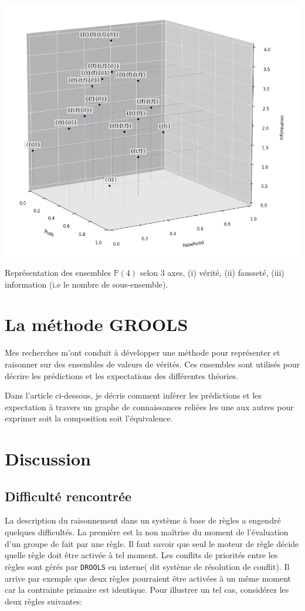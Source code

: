 \begin{refsegment}
\begin{shadedfigure}[H]
    \centering
    \includegraphics[width=\textwidth]{img/set_3d.png}
    \caption{Représentation des ensembles  $\mathbb{P}(4)$ selon 3 axes, (i) vérité, (ii) fausseté, (iii) information (i.e le nombre de sous-ensemble).}
    \label{fig:set3d}
\end{shadedfigure}

\section{La méthode GROOLS}\label{sec:methode}

Mes recherches m'ont conduit à développer une méthode pour représenter et raisonner sur des ensembles de valeurs de vérités. Ces ensembles sont utilisés pour décrire les prédictions et les expectations des différentes théories.

Dans l'article ci-dessous, je décris comment inférer les prédictions et les expectation à travers un graphe de connaissances reliées les une aux autres pour exprimer soit la composition soit l'équivalence.


\section{Discussion}
\subsection{Difficulté rencontrée}
La description du raisonnement dans un système à base de règles a engendré quelques difficultés. La première est la non maîtrise du moment de l'évaluation d'un groupe de fait par une règle. Il faut savoir que seul le moteur de règle décide quelle règle doit être activée à tel moment. Les conflits de priorités entre les règles sont gérés par \texttt{DROOLS} en interne( dit système de résolution de conflit). Il arrive par exemple que deux règles pourraient être activées à un même moment car la contrainte primaire est identique. Pour illustrer un tel cas, considérez les deux règles suivantes:


\end{refsegment}
